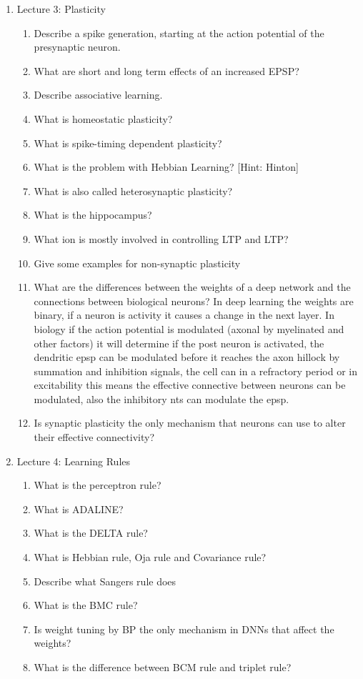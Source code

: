 \documentclass[main]{subfiles}
\begin{document}
\begin{enumerate}
    \item{Lecture 3: Plasticity}
    \begin{enumerate}[label*=\arabic*.]
        \item Describe a spike generation, starting at the action potential of the presynaptic neuron.
        \item What are short and long term effects of an increased EPSP?
        \item Describe associative learning.
        \item What is homeostatic plasticity?
        \item What is spike-timing dependent plasticity?
        \item What is the problem with Hebbian Learning? [Hint: Hinton]
        \item What is also called heterosynaptic plasticity?
        \item What is the hippocampus? 
        \item What ion is mostly involved in controlling LTP and LTP?
        \item Give some examples for non-synaptic plasticity
        \item What are the differences between the weights of a deep network and the connections between biological neurons?
        In deep learning the weights are binary, if a neuron is activity it causes a change in the next layer.
        In biology if the action potential is modulated (axonal by myelinated and other factors) it will determine if the post neuron is activated, the dendritic epsp can be modulated before it reaches the axon hillock by summation and inhibition signals, the cell can in a refractory period or in excitability this means the effective connective between neurons can be modulated, also the inhibitory nts can modulate the epsp.
        \item Is synaptic plasticity the only mechanism that neurons can use to alter their effective connectivity?
    \end{enumerate}
    
    \item{Lecture 4: Learning Rules}
    \begin{enumerate}[label*=\arabic*.]
        \item What is the perceptron rule?
        \item What is ADALINE?
        \item What is the DELTA rule?
        \item What is Hebbian rule, Oja rule and Covariance rule?
        \item Describe what Sangers rule does
        \item What is the BMC rule? 
        \item Is weight tuning by BP the only mechanism in DNNs that affect the weights?
        \item What is the difference between BCM rule and triplet rule?
    \end{enumerate}
    

\end{enumerate}
\end{document}

